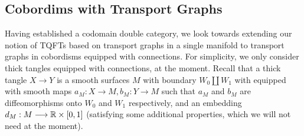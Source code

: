\documentclass[./Thick_TQFTs_and_Quantum_Information.tex]{subfiles}
\begin{document}
\subsection{Cobordims with Transport Graphs}

Having established a codomain double category, we look towards extending our
notion of TQFTs based on transport graphs in a single manifold to transport
graphs in cobordisms equipped with connections. For simplicity, we only consider
thick tangles equipped with connections, at the moment. Recall that a thick
tangle $X \to Y$ is a smooth surfaces $M$ with boundary $W_0 \amalg W_1$ with
equipped with smooth maps $a_M : X \to M, b_M : Y \to M$ such that $a_M$ and
$b_M$ are diffeomorphisms onto $W_0$ and $W_1$ respectively, and an embedding
$d_M : M \stackrel{}{\longrightarrow} \mathbb{R} \times [0, 1]$ (satisfying some additional properties, which we
will not need at the moment).
\end{document}
